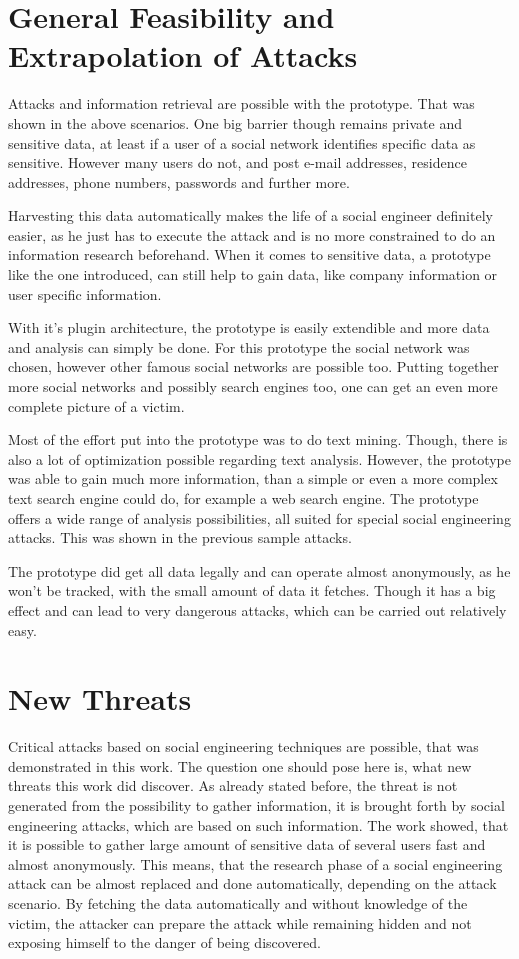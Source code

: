 \section{General Feasibility and Extrapolation of Attacks}

Attacks and information retrieval are possible with the prototype. That was
shown in the above scenarios. One big barrier though remains private and
sensitive data, at least if a user of a social network identifies specific data
as sensitive. However many users do not, and post e-mail addresses, residence
addresses, phone numbers, passwords and further more.

Harvesting this data automatically makes the life of a social engineer
definitely easier, as he just has to execute the attack and is no more
constrained to do an information research beforehand. When it comes to
sensitive data, a prototype like the one introduced, can still help to gain
data, like company information or user specific information.

With it's plugin architecture, the prototype is easily extendible and more data
and analysis can simply be done. For this prototype the \Twitter{} social
network was chosen, however other famous social networks are possible too.
Putting together more social networks and possibly search engines too, one can
get an even more complete picture of a victim.

Most of the effort put into the prototype was to do text mining. Though, there is
also a lot of optimization possible regarding text analysis. However, the
prototype was able to gain much more information, than a simple or even a more
complex text search engine could do, for example a web search engine. The prototype
offers a wide range of analysis possibilities, all suited for special social
engineering attacks. This was shown in the previous sample attacks.

The prototype did get all data legally and can operate almost anonymously, as
he won't be tracked, with the small amount of data it fetches. Though it has
a big effect and can lead to very dangerous attacks, which can be carried out
relatively easy.

\section{New Threats}

Critical attacks based on social engineering techniques are possible, that was
demonstrated in this work. The question one should pose here is, what new
threats this work did discover. As already stated before, the threat is not
generated from the possibility to gather information, it is brought forth by
social engineering attacks, which are based on such information. The work
showed, that it is possible to gather large amount of sensitive data of several
users fast and almost anonymously. This means, that the research phase of a
social engineering attack can be almost replaced and done automatically,
depending on the attack scenario. By fetching the data automatically and
without knowledge of the victim, the attacker can prepare the attack while
remaining hidden and not exposing himself to the danger of being discovered.

